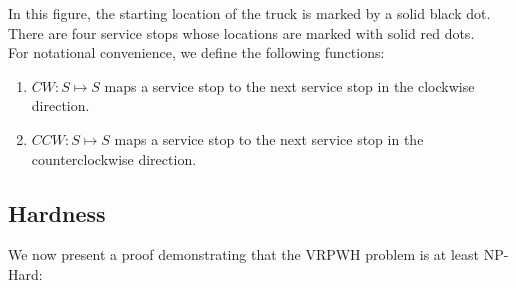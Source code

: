 \documentclass[12pt]{scrartcl}
\begin{document}
\noindent In this figure, the starting location of the truck is marked by a solid black dot. There are four service stops whose locations are marked with solid red dots.\\


For notational convenience, we define the following functions:

\begin{enumerate}
    \item $CW : S \mapsto S$ maps a service stop to the next service stop in the clockwise direction. 
    \item $CCW : S \mapsto S$ maps a service stop to the next service stop in the counterclockwise direction.
\end{enumerate}


\iffalse
Another interesting situation is when the vehicle's route is a line. We can model this situation by having the vehicle start at a single point on the real number line. Service stops are scattered along the number line. The vehicle travels towards the end of the number line while servicing some subset of the customers. Afterwards, it travels back to where it started on the number line, possibly servicing a different subset of customers on its way back. \\

The last two cases that are interesting to consider are when the underlying graph that the vehicle traverses is a tree, and the general case in which there is no pre-defined structure for the distribution of the service stops. In either of these cases, we can represent the vehicle's starting point and the service stops it must visit as vertices in a graph. The distances between any two vertices is represented by the weight between the two edges. \\
\fi

\subsection{Hardness}
We now present a proof demonstrating that the VRPWH problem is at least NP-Hard:
\end{document}
